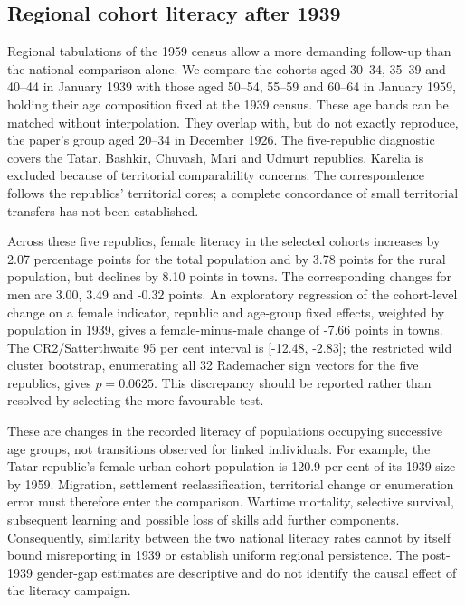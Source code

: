 \subsection*{Regional cohort literacy after 1939}

Regional tabulations of the 1959 census allow a more demanding follow-up
than the national comparison alone. We compare the cohorts aged 30--34,
35--39 and 40--44 in January 1939 with those aged 50--54, 55--59 and 60--64
in January 1959, holding their age composition fixed at the 1939 census.
These age bands can be matched without interpolation. They overlap with,
but do not exactly reproduce, the paper's group aged 20--34 in December
1926. The five-republic diagnostic covers the Tatar, Bashkir, Chuvash,
Mari and Udmurt republics. Karelia is excluded because of territorial
comparability concerns. The correspondence follows the republics'
territorial cores; a complete concordance of small territorial transfers
has not been established.

Across these five republics, female literacy in the selected cohorts
increases by 2.07 percentage points for the total population and by 3.78
points for the rural population, but declines by 8.10 points in towns.
The corresponding changes for men are 3.00, 3.49 and -0.32 points.
An exploratory regression of the cohort-level change on a female
indicator, republic and age-group fixed effects, weighted by population
in 1939, gives a female-minus-male change of -7.66 points in towns.
The CR2/Satterthwaite 95 per cent interval is [-12.48, -2.83]; the
restricted wild cluster bootstrap, enumerating all 32 Rademacher sign
vectors for the five republics, gives $p=0.0625$. This discrepancy should
be reported rather than resolved by selecting the more favourable test.

These are changes in the recorded literacy of populations occupying
successive age groups, not transitions observed for linked individuals.
For example, the Tatar republic's female urban cohort population is
120.9 per cent of its 1939 size by 1959. Migration, settlement
reclassification, territorial change or enumeration error must therefore
enter the comparison. Wartime mortality, selective survival, subsequent
learning and possible loss of skills add further components.
Consequently, similarity between the two national literacy rates cannot
by itself bound misreporting in 1939 or establish uniform regional
persistence. The post-1939 gender-gap estimates are descriptive and do
not identify the causal effect of the literacy campaign.

